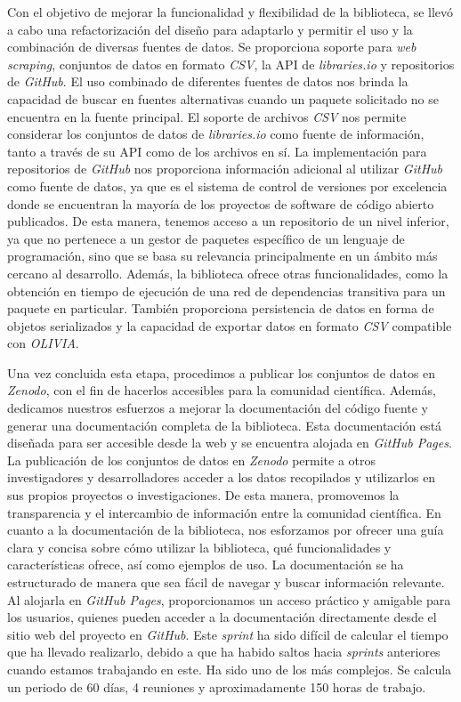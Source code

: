 Con el objetivo de mejorar la funcionalidad y flexibilidad de la biblioteca, se llevó a cabo una refactorización del 
diseño para adaptarlo y permitir el uso y la combinación de diversas fuentes de datos. Se proporciona soporte para 
\textit{web scraping}, conjuntos de datos en formato \textit{CSV}, la API de \textit{libraries.io} y repositorios de 
\textit{GitHub}.
El uso combinado de diferentes fuentes de datos nos brinda la capacidad de buscar en fuentes alternativas cuando un 
paquete solicitado no se encuentra en la fuente principal. El soporte de archivos \textit{CSV} nos permite considerar 
los conjuntos de datos de \textit{libraries.io} como fuente de información, tanto a través de su API como de los archivos 
en sí. La implementación para repositorios de \textit{GitHub} nos proporciona información adicional al utilizar 
\textit{GitHub} como fuente de datos, ya que es el sistema de control de versiones por excelencia donde se encuentran 
la mayoría de los proyectos de software de código abierto publicados. De esta manera, tenemos acceso a un repositorio 
de un nivel inferior, ya que no pertenece a un gestor de paquetes específico de un lenguaje de programación, sino que 
se basa su relevancia principalmente en un ámbito más cercano al desarrollo.
Además, la biblioteca ofrece otras funcionalidades, como la obtención en tiempo de ejecución de una red de dependencias 
transitiva para un paquete en particular. También proporciona persistencia de datos en forma de objetos serializados y 
la capacidad de exportar datos en formato \textit{CSV} compatible con \textit{OLIVIA}.

Una vez concluida esta etapa, procedimos a publicar los conjuntos de datos en \textit{Zenodo}, con el fin de hacerlos 
accesibles para la comunidad científica. Además, dedicamos nuestros esfuerzos a mejorar la documentación del código 
fuente y generar una documentación completa de la biblioteca. Esta documentación está diseñada para ser accesible desde
 la web y se encuentra alojada en \textit{GitHub Pages}.
La publicación de los conjuntos de datos en \textit{Zenodo} permite a otros investigadores y desarrolladores acceder a 
los datos recopilados y utilizarlos en sus propios proyectos o investigaciones. De esta manera, promovemos la transparencia 
y el intercambio de información entre la comunidad científica.
En cuanto a la documentación de la biblioteca, nos esforzamos por ofrecer una guía clara y concisa sobre cómo utilizar 
la biblioteca, qué funcionalidades y características ofrece, así como ejemplos de uso. La documentación se ha estructurado 
de manera que sea fácil de navegar y buscar información relevante. Al alojarla en \textit{GitHub Pages}, proporcionamos 
un acceso práctico y amigable para los usuarios, quienes pueden acceder a la documentación directamente desde el sitio web
 del proyecto en \textit{GitHub}.
Este \textit{sprint} ha sido difícil de calcular el tiempo que ha llevado realizarlo, debido a que ha habido saltos 
hacia \textit{sprints} anteriores cuando estamos trabajando en este. Ha sido uno de los más complejos. Se calcula un 
periodo de 60 días, 4 reuniones y aproximadamente 150 horas de trabajo.

